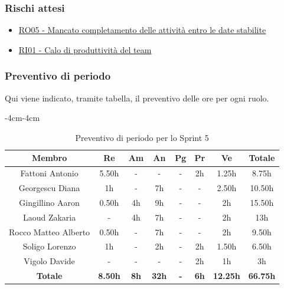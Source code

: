 \documentclass[a4paper,12pt]{article}
\begin{document}
\subsubsection{Rischi attesi}
\begin{itemize}
    \item \hyperref[RO05]{RO05 - Mancato completamento delle attività entro le date stabilite}
    \item \hyperref[RI01]{RI01 - Calo di produttività del team}
\end{itemize}

\subsubsection{Preventivo di periodo}
Qui viene indicato, tramite tabella, il preventivo delle ore per ogni ruolo.
\begin{table}[H]
    \begin{adjustwidth}{-4cm}{-4cm}
    \centering
    \begin{tabular}{|c|c|c|c|c|c|c|c|}
        \hline
        \textbf{Membro}& \textbf{Re} & \textbf{Am} & \textbf{An} & \textbf{Pg} & \textbf{Pr} & \textbf{Ve} & \textbf{Totale} \\
        \hline
        Fattoni Antonio & 5.50h & - & - & - & 2h & 1.25h & 8.75h \\
        \hline
        Georgescu Diana& 1h & - & 7h & - & - & 2.50h & 10.50h \\
        \hline
        Gingillino Aaron& 0.50h & 4h & 9h & - & - & 2h & 15.50h \\
        \hline
        Laoud Zakaria& - & 4h & 7h & - & - & 2h & 13h\\
        \hline
        Rocco Matteo Alberto & 0.50h & - & 7h & - & - & 2h & 9.50h \\
        \hline
        Soligo Lorenzo& 1h & - & 2h & - & 2h & 1.50h & 6.50h \\
        \hline
        Vigolo Davide & - & - & - & - & 2h & 1h & 3h \\
        \hline
        \textbf{Totale} & \textbf{8.50h} & \textbf{8h} & \textbf{32h} & \textbf{-} & \textbf{6h} & \textbf{12.25h} & \textbf{66.75h} \\
        \hline
    \end{tabular}
    \caption{Preventivo di periodo per lo Sprint 5}
    \end{adjustwidth}
\end{table}
\end{document}

